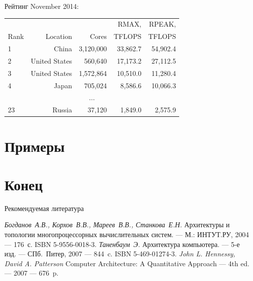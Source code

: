 \begin{frame}{Рейтинг}
November 2014:
\begin{table}[htpb]
    \begin{center}
    \begin{tabular}{|l|r|r|r|r|}
    \hline
            &                   &               &   RMAX,       &   RPEAK,      \\
    Rank    &   Location        &   Cores       &   TFLOPS      &   TFLOPS      \\
    \hline
    1       &   China           &   3,120,000   &   33,862.7    &   54,902.4    \\
    \hline
    2       &   United States   &   560,640     &   17,173.2    &   27,112.5    \\
    \hline
    3       &   United States   &   1,572,864   &   10,510.0    &   11,280.4    \\
    \hline
    4       &   Japan           &   705,024     &   8,586.6     &   10,066.3    \\
    \hline
    \multicolumn{5}{c}{...}                                                     \\
    \hline
    23      &   Russia          &   37,120      &   1,849.0     &   2,575.9     \\
    \hline
    \end{tabular}
    \end{center}
\end{table}
\end{frame}

\section{Примеры}

\section*{Конец}

\begin{frame}[allowframebreaks]{Рекомендуемая литература}
\begin{thebibliography}{99}
    \bibitem{} \textit{Богданов~А.В., Корхов~В.В., Мареев~В.В., Станкова~Е.Н.}
    Архитектуры и топологии многопроцессорных вычислительных систем. --- М.:
    ИНТУТ.РУ, 2004 --- 176~с. ISBN 5-9556-0018-3.
    \bibitem{} \textit{Таненбаум~Э.} Архитектура компьютера. --- 5-е изд. ---
    СПб.~Питер, 2007 --- 844~c. ISBN 5-469-01274-3.
    \bibitem{} \textit{John L. Hennessy, David A. Patterson} Computer
    Architecture: A Quantitative Approach --- 4th ed. --- 2007 --- 676~p.
\end{thebibliography}
\end{frame}

